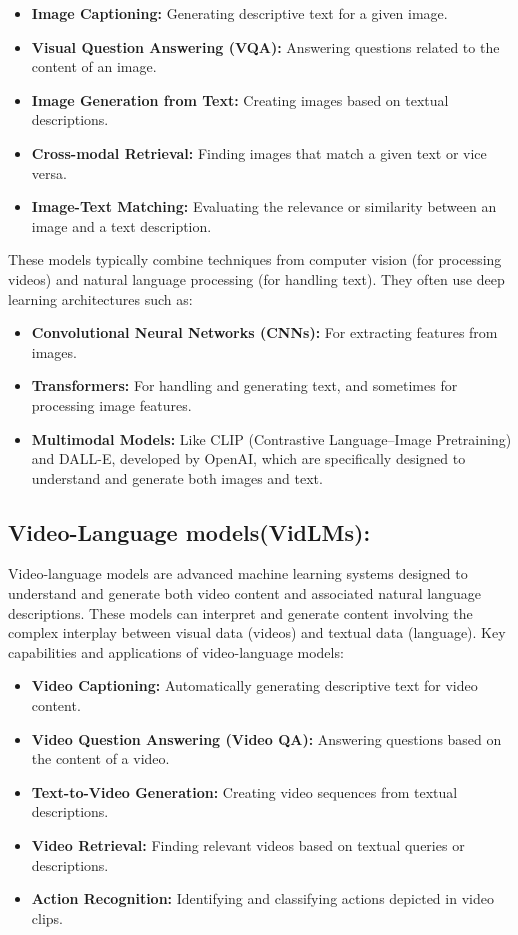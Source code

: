 \begin{itemize}
\item \textbf{Image Captioning:} Generating descriptive text for a given image.
\item \textbf{Visual Question Answering (VQA):} Answering questions related to the content of an image.
\item \textbf{Image Generation from Text:} Creating images based on textual descriptions.
\item \textbf{Cross-modal Retrieval:} Finding images that match a given text or vice versa.
\item \textbf{Image-Text Matching:} Evaluating the relevance or similarity between an image and a text description.
\end{itemize}

These models typically combine techniques from computer vision (for processing videos) and natural language processing (for handling text). They often use deep learning architectures such as:

\begin{itemize}
\item \textbf{Convolutional Neural Networks (CNNs):} For extracting features from images.
\item \textbf{Transformers:} For handling and generating text, and sometimes for processing image features.
\item \textbf{Multimodal Models:} Like CLIP (Contrastive Language–Image Pretraining) and DALL-E, developed by OpenAI, which are specifically designed to understand and generate both images and text.
\end{itemize}
\subsection{Video-Language models(VidLMs):} \label{vlm}
Video-language models are advanced machine learning systems designed to understand and generate both video content and associated natural language descriptions. These models can interpret and generate content involving the complex interplay between visual data (videos) and textual data (language). Key capabilities and applications of video-language models:

\begin{itemize}
\item \textbf{Video Captioning:} Automatically generating descriptive text for video content.
\item \textbf{Video Question Answering (Video QA):} Answering questions based on the content of a video.
\item \textbf{Text-to-Video Generation:} Creating video sequences from textual descriptions.
\item \textbf{Video Retrieval:} Finding relevant videos based on textual queries or descriptions.
\item \textbf{Action Recognition:} Identifying and classifying actions depicted in video clips.
\end{itemize}

